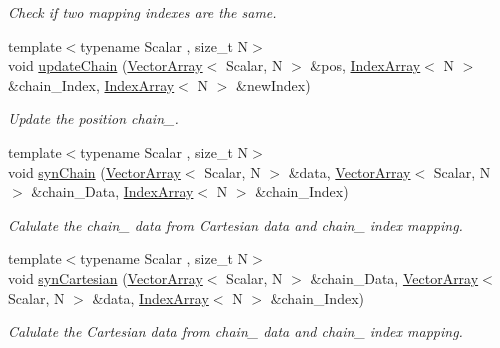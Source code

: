 \begin{DoxyCompactItemize}
\begin{DoxyCompactList}\small\item\em Check if two mapping indexes are the same. \end{DoxyCompactList}\item 
{\footnotesize template$<$typename Scalar , size\+\_\+t N$>$ }\\void \mbox{\hyperlink{namespacechain_a36c1d242033be6243c1cff525f818724}{update\+Chain}} (\mbox{\hyperlink{namespacechain_aa715d2f046187ea9f0c3ea55605d6214}{Vector\+Array}}$<$ Scalar, N $>$ \&pos, \mbox{\hyperlink{namespacechain_aa40d2da395c0ac2bc5f37832442ac403}{Index\+Array}}$<$ N $>$ \&chain_\+Index, \mbox{\hyperlink{namespacechain_aa40d2da395c0ac2bc5f37832442ac403}{Index\+Array}}$<$ N $>$ \&new\+Index)
\begin{DoxyCompactList}\small\item\em Update the position chain_. \end{DoxyCompactList}\item
{\footnotesize template$<$typename Scalar , size\+\_\+t N$>$ }\\void \mbox{\hyperlink{namespacechain_abdcb44461ef66afb82d42ff5a441ed5c}{syn\+Chain}} (\mbox{\hyperlink{namespacechain_aa715d2f046187ea9f0c3ea55605d6214}{Vector\+Array}}$<$ Scalar, N $>$ \&data, \mbox{\hyperlink{namespacechain_aa715d2f046187ea9f0c3ea55605d6214}{Vector\+Array}}$<$ Scalar, N $>$ \&chain_\+Data, \mbox{\hyperlink{namespacechain_aa40d2da395c0ac2bc5f37832442ac403}{Index\+Array}}$<$ N $>$ \&chain_\+Index)
\begin{DoxyCompactList}\small\item\em Calulate the chain_ data from Cartesian data and chain_ index mapping. \end{DoxyCompactList}\item
{\footnotesize template$<$typename Scalar , size\+\_\+t N$>$ }\\void \mbox{\hyperlink{namespacechain_ae85619534182ce257fc47857a9c133e4}{syn\+Cartesian}} (\mbox{\hyperlink{namespacechain_aa715d2f046187ea9f0c3ea55605d6214}{Vector\+Array}}$<$ Scalar, N $>$ \&chain_\+Data, \mbox{\hyperlink{namespacechain_aa715d2f046187ea9f0c3ea55605d6214}{Vector\+Array}}$<$ Scalar, N $>$ \&data, \mbox{\hyperlink{namespacechain_aa40d2da395c0ac2bc5f37832442ac403}{Index\+Array}}$<$ N $>$ \&chain_\+Index)
\begin{DoxyCompactList}\small\item\em Calulate the Cartesian data from chain_ data and chain_ index mapping. \end{DoxyCompactList}\end{DoxyCompactItemize}


